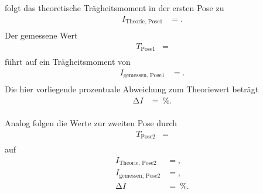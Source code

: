 folgt das theoretische Trägheitsmoment in der ersten Pose zu
\begin{align*}
  I_{\text{Theorie, Pose1}}  &= . \\
\end{align*}
Der gemessene Wert
\begin{align*}
  T_{\text{Pose1}}  &=  \\
\end{align*}
führt auf ein Trägheitsmoment von
\begin{align*}
  I_{\text{gemessen, Pose1}}  &= . \\
\end{align*}
Die hier vorliegende prozentuale Abweichung zum Theoriewert beträgt
\begin{align*}
  \increment I  &= \:\si{\percent}. \\
\end{align*}

Analog folgen die Werte zur zweiten Pose durch
\begin{align*}
  T_{\text{Pose2}}  &=  \\
\end{align*}
auf
\begin{align*}
  I_{\text{Theorie, Pose2}}   &= , \\
  I_{\text{gemessen, Pose2}}  &= , \\
  \increment I                 &= \:\si{\percent}. \\
\end{align*}




